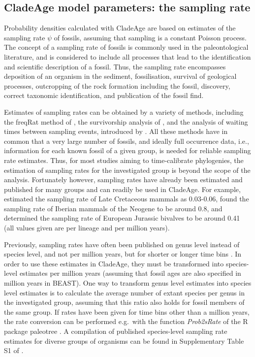 \documentclass{article}
\begin{document}
\subsection{CladeAge model parameters: the sampling rate}\label{sampling_rate}

Probability densities calculated with CladeAge are based on estimates of the sampling rate $\psi$ of fossils, assuming that sampling is a constant Poisson process. The concept of a sampling rate of fossils is commonly used in the paleontological literature, and is considered to include all processes that lead to the identification and scientific description of a fossil. Thus, the sampling rate encompasses deposition of an organism in the sediment, fossilisation, survival of geological processes, outcropping of the rock formation including the fossil, discovery, correct taxonomic identification, and publication of the fossil find.

Estimates of sampling rates can be obtained by a variety of methods, including the freqRat method of \citet{Foote:1996tf}, the survivorship analysis of \citet{Foote:2001js}, and the analysis of waiting times between sampling events, introduced by \citep{Solow:1997tba}. All these methods have in common that a very large number of fossils, and ideally full occurrence data, i.e., information for each known fossil of a given group, is needed for reliable sampling rate estimates. Thus, for most studies aiming to time-calibrate phylogenies, the estimation of sampling rates for the investigated group is beyond the scope of the analysis. Fortunately however, sampling rates have already been estimated and published for many groups and can readily be used in CladeAge. For example, \citet{Foote:1999ts} estimated the sampling rate of Late Cretaceous mammals as 0.03-0.06, \citet{Alba:2001va} found the sampling rate of Iberian mammals of the Neogene to be around 0.8, and \citet{Foote:1996tf} determined the sampling rate of European Jurassic bivalves to be around 0.41 (all values given are per lineage and per million years).

Previously, sampling rates have often been published on genus level instead of species level, and not per million years, but for shorter or longer time bins \citep{Foote:1996tf,Foote:1999vr,Friedman:2011es}. In order to use these estimates in CladeAge, they must be transformed into species-level estimates per million years (assuming that fossil ages are also specified in million years in BEAST). One way to transform genus level estimates into species level estimates is to calculate the average number of extant species per genus in the investigated group, assuming that this ratio also holds for fossil members of the same group. If rates have been given for time bins other than a million years, the rate conversion can be performed e.g.\ with the function \emph{Prob2sRate} of the R package paleotree \citep{Bapst:2012hg}. A compilation of published species-level sampling rate estimates for diverse groups of organisms can be found in Supplementary Table S1 of \citet{Matschiner:2016ga}.
\end{document}
